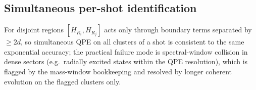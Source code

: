 \subsection{Simultaneous per-shot identification}

For disjoint regions $[H_{R_i},H_{R_j}]$ acts only through boundary
terms separated by $\ge 2d$, so simultaneous QPE on all clusters of a
shot is consistent to the same exponential accuracy; the practical
failure mode is spectral-window collision in dense sectors (e.g.\
radially excited states within the QPE resolution), which is flagged by
the mass-window bookkeeping and resolved by longer coherent evolution
on the flagged clusters only.
